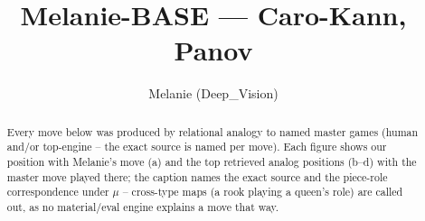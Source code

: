 \documentclass[11pt]{article}
\title{Melanie-BASE — Caro-Kann, Panov}
\author{Melanie (Deep\_Vision)}
\date{}
\begin{document}
\maketitle

\begin{abstract}Every move below was produced by relational analogy to named master games (human and/or top-engine -- the exact source is named per move). Each figure shows our position with Melanie's move (a) and the top retrieved analog positions (b--d) with the master move played there; the caption names the exact source and the piece-role correspondence under $\mu$ -- cross-type maps (a rook playing a queen's role) are called out, as no material/eval engine explains a move that way.\end{abstract}

\begin{figure}[p]\centering
\begin{subfigure}{0.46\textwidth}\centering
\resizebox{\linewidth}{!}{%
\newchessgame
\chessboard[
  setfen={rnbqk2r/pp2bppp/4pn2/3p4/2PP4/2N2N2/PP3PPP/R1BQKB1R w KQkq - 2 7},
  showmover=false,
  pgfstyle=straightmove, color=movearrow, markmove={c4-c5}
]}
\caption{}
\end{subfigure}\hfill
\begin{subfigure}{0.46\textwidth}\centering
\resizebox{\linewidth}{!}{%
\newchessgame
\chessboard[
  setfen={r1bqkb1r/pp3ppp/2n1pn2/3p4/2PP4/2N2N2/PP3PPP/R1BQKB1R w KQkq - 0 7},
  showmover=false,
  pgfstyle=straightmove, color=movearrow, markmove={c4-c5}
]}
\caption{}
\end{subfigure}
\\[4pt]
\begin{subfigure}{0.46\textwidth}\centering
\resizebox{\linewidth}{!}{%
\newchessgame
\chessboard[
  setfen={r1bqkb1r/pp3ppp/2n1pn2/3p4/2PP4/2N2N2/PP3PPP/R1BQKB1R w KQkq - 0 7},
  showmover=false,
  pgfstyle=straightmove, color=movearrow, markmove={c4-c5}
]}
\caption{}
\end{subfigure}\hfill
\begin{subfigure}{0.46\textwidth}\centering
\resizebox{\linewidth}{!}{%
\newchessgame
\chessboard[
  setfen={r1bqkb1r/pp3ppp/2n1pn2/3p4/2PP4/2N2N2/PP3PPP/R1BQKB1R w KQkq - 0 7},
  showmover=false,
  pgfstyle=straightmove, color=movearrow, markmove={c4-c5}
]}
\caption{}
\end{subfigure}

\end{figure}
\end{document}
